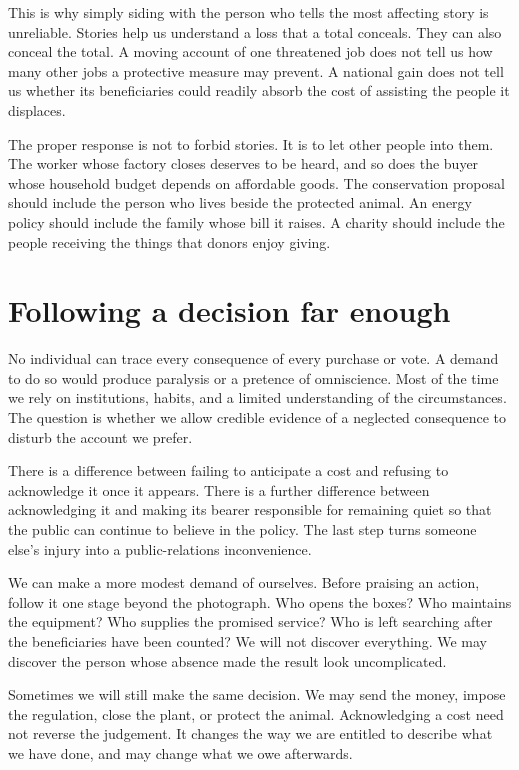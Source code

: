 \documentclass[12pt,a4paper]{book}
\begin{document}
This is why simply siding with the person who tells the most affecting story is unreliable. Stories help us understand a loss that a total conceals. They can also conceal the total. A moving account of one threatened job does not tell us how many other jobs a protective measure may prevent. A national gain does not tell us whether its beneficiaries could readily absorb the cost of assisting the people it displaces.

The proper response is not to forbid stories. It is to let other people into them. The worker whose factory closes deserves to be heard, and so does the buyer whose household budget depends on affordable goods. The conservation proposal should include the person who lives beside the protected animal. An energy policy should include the family whose bill it raises. A charity should include the people receiving the things that donors enjoy giving.

\section*{Following a decision far enough}

No individual can trace every consequence of every purchase or vote. A demand to do so would produce paralysis or a pretence of omniscience. Most of the time we rely on institutions, habits, and a limited understanding of the circumstances. The question is whether we allow credible evidence of a neglected consequence to disturb the account we prefer.

There is a difference between failing to anticipate a cost and refusing to acknowledge it once it appears. There is a further difference between acknowledging it and making its bearer responsible for remaining quiet so that the public can continue to believe in the policy. The last step turns someone else's injury into a public-relations inconvenience.

We can make a more modest demand of ourselves. Before praising an action, follow it one stage beyond the photograph. Who opens the boxes? Who maintains the equipment? Who supplies the promised service? Who is left searching after the beneficiaries have been counted? We will not discover everything. We may discover the person whose absence made the result look uncomplicated.

Sometimes we will still make the same decision. We may send the money, impose the regulation, close the plant, or protect the animal. Acknowledging a cost need not reverse the judgement. It changes the way we are entitled to describe what we have done, and may change what we owe afterwards.
\end{document}
